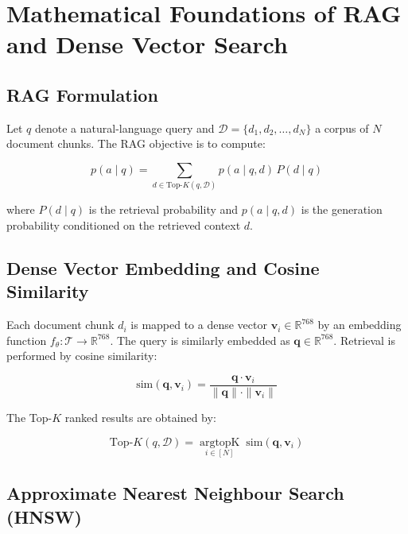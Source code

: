 \documentclass[12pt,a4paper]{report}
\begin{document}
\section{Mathematical Foundations of RAG and Dense Vector Search}

\subsection{RAG Formulation}

Let $q$ denote a natural-language query and $\mathcal{D} = \{d_1, d_2, \ldots,
d_N\}$ a corpus of $N$ document chunks. The RAG objective is to compute:

\begin{equation}
  p(a \mid q) = \sum_{d \in \text{Top-}K(q,\mathcal{D})} p(a \mid q, d)\,
                P(d \mid q)
  \label{eq:rag}
\end{equation}

where $P(d \mid q)$ is the retrieval probability and $p(a \mid q, d)$ is the
generation probability conditioned on the retrieved context $d$.

\subsection{Dense Vector Embedding and Cosine Similarity}

Each document chunk $d_i$ is mapped to a dense vector
$\mathbf{v}_i \in \mathbb{R}^{768}$ by an embedding function
$f_\theta: \mathcal{T} \to \mathbb{R}^{768}$. The query is similarly embedded
as $\mathbf{q} \in \mathbb{R}^{768}$. Retrieval is performed by cosine
similarity:

\begin{equation}
  \text{sim}(\mathbf{q}, \mathbf{v}_i) =
  \frac{\mathbf{q} \cdot \mathbf{v}_i}{\|\mathbf{q}\| \cdot \|\mathbf{v}_i\|}
  \label{eq:cosine}
\end{equation}

The Top-$K$ ranked results are obtained by:

\begin{equation}
  \text{Top-}K(q, \mathcal{D}) = \underset{i \in [N]}{\arg\text{topK}}\;
  \text{sim}(\mathbf{q}, \mathbf{v}_i)
  \label{eq:topk}
\end{equation}

\subsection{Approximate Nearest Neighbour Search (HNSW)}
\end{document}
